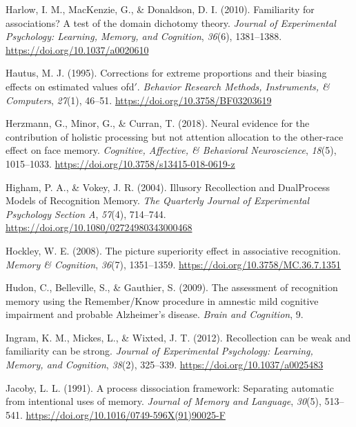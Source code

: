 \documentclass[
  11pt,
]{article}
\begin{document}
\leavevmode\hypertarget{ref-harlow2010}{}%
Harlow, I. M., MacKenzie, G., \& Donaldson, D. I. (2010). Familiarity
for associations? A test of the domain dichotomy theory. \emph{Journal
of Experimental Psychology: Learning, Memory, and Cognition},
\emph{36}(6), 1381--1388. \url{https://doi.org/10.1037/a0020610}

\leavevmode\hypertarget{ref-hautus1995}{}%
Hautus, M. J. (1995). Corrections for extreme proportions and their
biasing effects on estimated values ofd\({'}\). \emph{Behavior Research
Methods, Instruments, \& Computers}, \emph{27}(1), 46--51.
\url{https://doi.org/10.3758/BF03203619}

\leavevmode\hypertarget{ref-herzmann2018}{}%
Herzmann, G., Minor, G., \& Curran, T. (2018). Neural evidence for the
contribution of holistic processing but not attention allocation to the
other-race effect on face memory. \emph{Cognitive, Affective, \&
Behavioral Neuroscience}, \emph{18}(5), 1015--1033.
\url{https://doi.org/10.3758/s13415-018-0619-z}

\leavevmode\hypertarget{ref-higham2004}{}%
Higham, P. A., \& Vokey, J. R. (2004). Illusory Recollection and
DualProcess Models of Recognition Memory. \emph{The Quarterly Journal of
Experimental Psychology Section A}, \emph{57}(4), 714--744.
\url{https://doi.org/10.1080/02724980343000468}

\leavevmode\hypertarget{ref-hockley2008}{}%
Hockley, W. E. (2008). The picture superiority effect in associative
recognition. \emph{Memory \& Cognition}, \emph{36}(7), 1351--1359.
\url{https://doi.org/10.3758/MC.36.7.1351}

\leavevmode\hypertarget{ref-hudon2009}{}%
Hudon, C., Belleville, S., \& Gauthier, S. (2009). The assessment of
recognition memory using the Remember/Know procedure in amnestic mild
cognitive impairment and probable Alzheimer's disease. \emph{Brain and
Cognition}, 9.

\leavevmode\hypertarget{ref-ingram2012}{}%
Ingram, K. M., Mickes, L., \& Wixted, J. T. (2012). Recollection can be
weak and familiarity can be strong. \emph{Journal of Experimental
Psychology: Learning, Memory, and Cognition}, \emph{38}(2), 325--339.
\url{https://doi.org/10.1037/a0025483}

\leavevmode\hypertarget{ref-jacoby1991}{}%
Jacoby, L. L. (1991). A process dissociation framework: Separating
automatic from intentional uses of memory. \emph{Journal of Memory and
Language}, \emph{30}(5), 513--541.
\url{https://doi.org/10.1016/0749-596X(91)90025-F}
\end{document}
